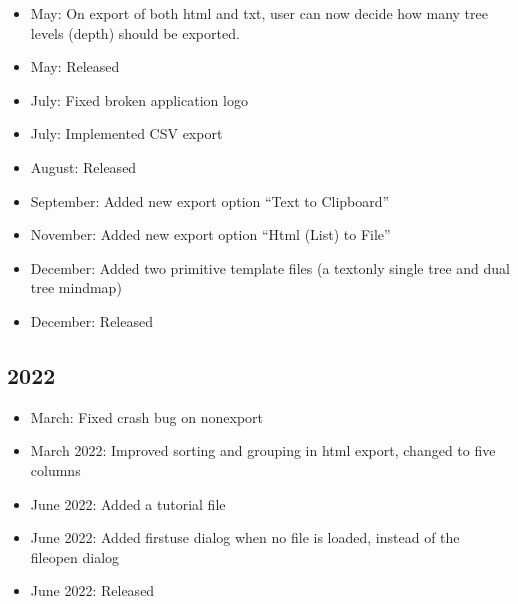\documentclass[letterpaper,10pt,english]{sphinxmanual}
\begin{document}
\begin{itemize}
\item {} 
\sphinxAtStartPar
May: On export of both html and txt, user can now decide how many tree levels (depth) should be exported.

\item {} 
\sphinxAtStartPar
May: Released 

\item {} 
\sphinxAtStartPar
July: Fixed broken application logo

\item {} 
\sphinxAtStartPar
July: Implemented CSV export

\item {} 
\sphinxAtStartPar
August: Released 

\item {} 
\sphinxAtStartPar
September: Added new export option “Text to Clipboard”

\item {} 
\sphinxAtStartPar
November: Added new export option “Html (List) to File”

\item {} 
\sphinxAtStartPar
December: Added two primitive template files (a text\sphinxhyphen{}only single tree and dual tree mindmap)

\item {} 
\sphinxAtStartPar
December: Released 

\end{itemize}


\subsection{2022}
\label{\detokenize{releases:id8}}\begin{itemize}
\item {} 
\sphinxAtStartPar
March: Fixed crash bug on non\sphinxhyphen{}export

\item {} 
\sphinxAtStartPar
March 2022: Improved sorting and grouping in html export, changed to five columns

\item {} 
\sphinxAtStartPar
June 2022: Added a tutorial file

\item {} 
\sphinxAtStartPar
June 2022: Added first\sphinxhyphen{}use dialog when no file is loaded, instead of the file\sphinxhyphen{}open dialog

\item {} 
\sphinxAtStartPar
June 2022: Released 

\end{itemize}
\end{document}
